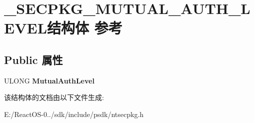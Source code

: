 \hypertarget{struct___s_e_c_p_k_g___m_u_t_u_a_l___a_u_t_h___l_e_v_e_l}{}\section{\+\_\+\+S\+E\+C\+P\+K\+G\+\_\+\+M\+U\+T\+U\+A\+L\+\_\+\+A\+U\+T\+H\+\_\+\+L\+E\+V\+E\+L结构体 参考}
\label{struct___s_e_c_p_k_g___m_u_t_u_a_l___a_u_t_h___l_e_v_e_l}
\subsection*{Public 属性}
\begin{DoxyCompactItemize}
\item 
\mbox{\label{struct___s_e_c_p_k_g___m_u_t_u_a_l___a_u_t_h___l_e_v_e_l_a0fa3002c3ff432487482cd17acdd751f}} 
U\+L\+O\+NG {\bfseries Mutual\+Auth\+Level}
\end{DoxyCompactItemize}


该结构体的文档由以下文件生成\+:\begin{DoxyCompactItemize}
\item 
E\+:/\+React\+O\+S-\/0../sdk/include/psdk/ntsecpkg.\+h\end{DoxyCompactItemize}
